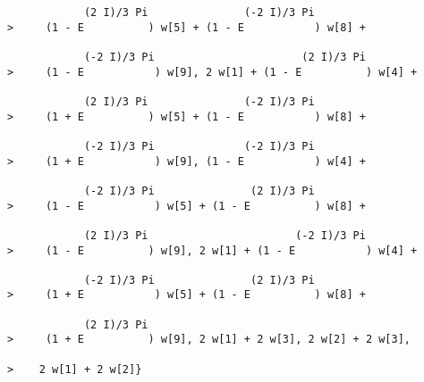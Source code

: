 \begin{verbatim}
            (2 I)/3 Pi               (-2 I)/3 Pi
>     (1 - E          ) w[5] + (1 - E           ) w[8] + 
 
            (-2 I)/3 Pi                       (2 I)/3 Pi
>     (1 - E           ) w[9], 2 w[1] + (1 - E          ) w[4] + 
 
            (2 I)/3 Pi               (-2 I)/3 Pi
>     (1 + E          ) w[5] + (1 - E           ) w[8] + 
 
            (-2 I)/3 Pi              (-2 I)/3 Pi
>     (1 + E           ) w[9], (1 - E           ) w[4] + 
 
            (-2 I)/3 Pi               (2 I)/3 Pi
>     (1 - E           ) w[5] + (1 - E          ) w[8] + 
 
            (2 I)/3 Pi                       (-2 I)/3 Pi
>     (1 - E          ) w[9], 2 w[1] + (1 - E           ) w[4] + 
 
            (-2 I)/3 Pi               (2 I)/3 Pi
>     (1 + E           ) w[5] + (1 - E          ) w[8] + 
 
            (2 I)/3 Pi
>     (1 + E          ) w[9], 2 w[1] + 2 w[3], 2 w[2] + 2 w[3], 
 
>    2 w[1] + 2 w[2]}

\end{verbatim}


